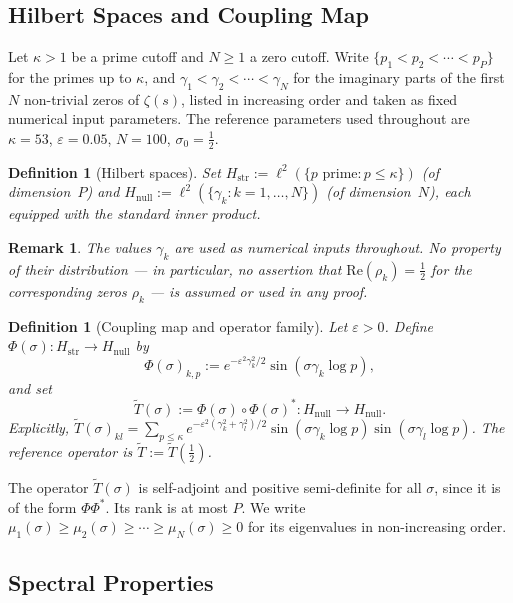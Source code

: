 \documentclass[11pt]{article}
\newtheorem{definition}[theorem]{Definition}
\newtheorem*{remark}{Remark}
\newcommand{\Hstr}{H_{\mathrm{str}}}
\newcommand{\Hnull}{H_{\mathrm{null}}}
\newcommand{\Tt}{\widetilde{T}}
\begin{document}
\subsection{Hilbert Spaces and Coupling Map}

Let $\kappa>1$ be a prime cutoff and $N\geq 1$ a zero cutoff.
Write $\{p_1<p_2<\cdots<p_P\}$ for the primes up to $\kappa$,
and $\gamma_1<\gamma_2<\cdots<\gamma_N$ for the imaginary parts
of the first $N$ non-trivial zeros of $\zeta(s)$, listed in
increasing order and taken as fixed numerical input parameters.
The reference parameters used throughout are
$\kappa=53$, $\varepsilon=0.05$, $N=100$, $\sigma_0=\tfrac{1}{2}$.

\begin{definition}[Hilbert spaces]
\label{def:spaces}
Set $\Hstr := \ell^2(\{p\text{ prime}: p\leq\kappa\})$
(of dimension~$P$) and $\Hnull := \ell^2(\{\gamma_k: k=1,\ldots,N\})$
(of dimension~$N$), each equipped with the standard inner product.
\end{definition}

\begin{remark}
The values $\gamma_k$ are used as numerical inputs throughout.
No property of their distribution --- in particular, no assertion
that $\mathrm{Re}(\rho_k)=\tfrac{1}{2}$ for the corresponding
zeros $\rho_k$ --- is assumed or used in any proof.
\end{remark}

\begin{definition}[Coupling map and operator family]
\label{def:coupling}
Let $\varepsilon>0$.
Define $\Phi(\sigma)\colon\Hstr\to\Hnull$ by
\[
\Phi(\sigma)_{k,p} := e^{-\varepsilon^2\gamma_k^2/2}\sin(\sigma\gamma_k\log p),
\]
and set
\[
\Tt(\sigma) := \Phi(\sigma)\circ\Phi(\sigma)^*\colon\Hnull\to\Hnull.
\]
Explicitly,
$\Tt(\sigma)_{kl}
  = \sum_{p\leq\kappa} e^{-\varepsilon^2(\gamma_k^2+\gamma_l^2)/2}
    \sin(\sigma\gamma_k\log p)\sin(\sigma\gamma_l\log p)$.
The reference operator is $\Tt := \Tt(\tfrac{1}{2})$.
\end{definition}

The operator $\Tt(\sigma)$ is self-adjoint and positive semi-definite
for all $\sigma$, since it is of the form $\Phi\Phi^*$.
Its rank is at most $P$.
We write $\mu_1(\sigma)\geq\mu_2(\sigma)\geq\cdots\geq\mu_N(\sigma)\geq 0$
for its eigenvalues in non-increasing order.

\subsection{Spectral Properties}
\label{ssec:spectral}
\end{document}
